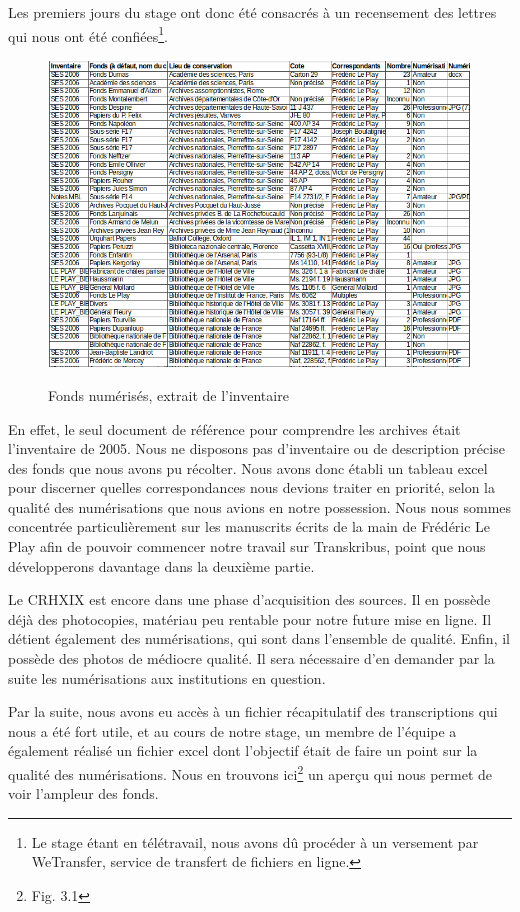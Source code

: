 Les premiers jours du stage ont donc été consacrés à un recensement des lettres qui nous ont été confiées\footnote{Le stage étant en télétravail, nous avons dû procéder à un versement par WeTransfer, service de transfert de fichiers en ligne.}.\begin{figure}[ht]
    \centering
    \caption{Fonds numérisés, extrait de l'inventaire}
    \includegraphics[width=16cm]{images/inventaire_numerisationsRHDL.png}
    \label{inventaire_numerisationsRHDL}
\end{figure} En effet, le seul document de référence pour comprendre les archives était l'inventaire de 2005. Nous ne disposons pas d’inventaire ou de description précise des fonds que nous avons pu récolter. Nous avons donc établi un tableau excel pour discerner quelles correspondances nous devions traiter en priorité, selon la qualité des numérisations que nous avions en notre possession. 
Nous nous sommes concentrée particulièrement sur les manuscrits écrits de la main de Frédéric Le Play afin de pouvoir commencer notre travail sur Transkribus, point que nous développerons davantage dans la deuxième partie.

Le CRHXIX est encore dans une phase d'acquisition des sources. Il en possède déjà des photocopies, matériau peu rentable pour notre future mise en ligne. Il détient également des numérisations, qui sont dans l'ensemble de qualité. Enfin, il possède des photos de médiocre qualité. Il sera nécessaire d'en demander par la suite les numérisations aux institutions en question.

Par la suite, nous avons eu accès à un fichier récapitulatif des transcriptions qui nous a été fort utile, et au cours de notre stage, un membre de l'équipe a également réalisé un fichier excel dont l'objectif était de faire un point sur la qualité des numérisations. Nous en trouvons ici\footnote{Fig. 3.1} un aperçu qui nous permet de voir l'ampleur des fonds.

